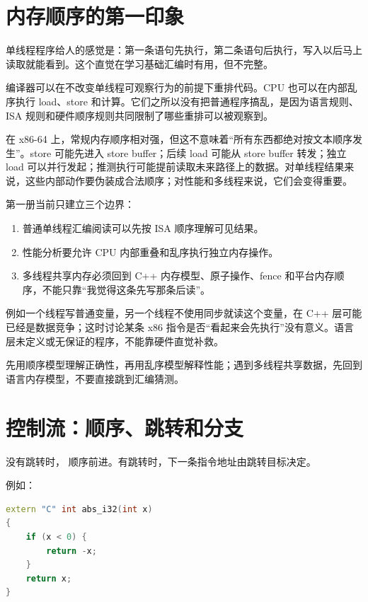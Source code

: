\section{内存顺序的第一印象}

单线程程序给人的感觉是：第一条语句先执行，第二条语句后执行，写入以后马上读取就能看到。这个直觉在学习基础汇编时有用，但不完整。

编译器可以在不改变单线程可观察行为的前提下重排代码。CPU 也可以在内部乱序执行 load、store 和计算。它们之所以没有把普通程序搞乱，是因为语言规则、ISA 规则和硬件顺序规则共同限制了哪些重排可以被观察到。

在 x86-64 上，常规内存顺序相对强，但这不意味着“所有东西都绝对按文本顺序发生”。store 可能先进入 store buffer；后续 load 可能从 store buffer 转发；独立 load 可以并行发起；推测执行可能提前读取未来路径上的数据。对单线程结果来说，这些内部动作要伪装成合法顺序；对性能和多线程来说，它们会变得重要。

第一册当前只建立三个边界：

\begin{enumerate}
  \item 普通单线程汇编阅读可以先按 ISA 顺序理解可见结果。
  \item 性能分析要允许 CPU 内部重叠和乱序执行独立内存操作。
  \item 多线程共享内存必须回到 C++ 内存模型、原子操作、fence 和平台内存顺序，不能只靠“我觉得这条先写那条后读”。
\end{enumerate}

例如一个线程写普通变量，另一个线程不使用同步就读这个变量，在 C++ 层可能已经是数据竞争；这时讨论某条 x86 指令是否“看起来会先执行”没有意义。语言层未定义或无保证的程序，不能靠硬件直觉补救。

\begin{mentalmodel}
先用顺序模型理解正确性，再用乱序模型解释性能；遇到多线程共享数据，先回到语言内存模型，不要直接跳到汇编猜测。
\end{mentalmodel}

\section{控制流：顺序、跳转和分支}

没有跳转时， 顺序前进。有跳转时，下一条指令地址由跳转目标决定。

例如：

\begin{lstlisting}[language=C++]
extern "C" int abs_i32(int x)
{
    if (x < 0) {
        return -x;
    }
    return x;
}
\end{lstlisting}

